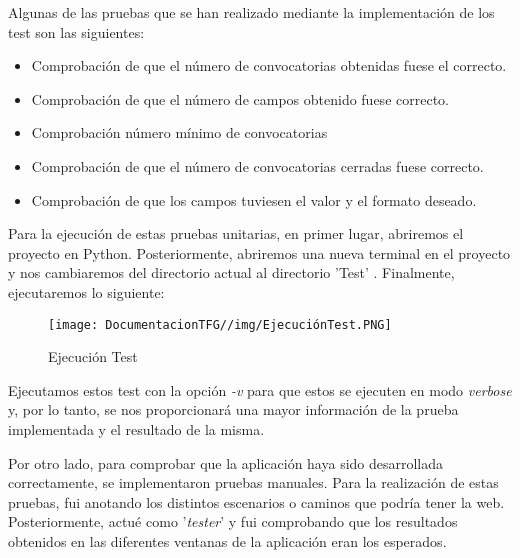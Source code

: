 Algunas de las pruebas que se han realizado mediante la implementación de los test son las siguientes:

\begin{itemize}
    \item Comprobación de que el número de convocatorias obtenidas fuese el correcto.
    \item Comprobación de que el número de campos obtenido fuese correcto.
    \item Comprobación número mínimo de convocatorias
    \item Comprobación de que el número de convocatorias cerradas fuese correcto.
    \item Comprobación de que los campos tuviesen el valor y el formato deseado.
\end{itemize}

Para la ejecución de estas pruebas unitarias, en primer lugar, abriremos el proyecto en Python. Posteriormente, abriremos una nueva terminal en el proyecto y nos cambiaremos del directorio actual al directorio 'Test' . Finalmente, ejecutaremos lo siguiente: 

\begin{figure}[H]
    \centering
    \texttt{[image: DocumentacionTFG//img/EjecuciónTest.PNG]}
    \caption{Ejecución Test}
\end{figure}

Ejecutamos estos test con la opción \textit{-v} para que estos se ejecuten en modo \textit{verbose} y, por lo tanto, se nos proporcionará una mayor información de la prueba implementada y el resultado de la misma.

Por otro lado, para comprobar que la aplicación haya sido desarrollada correctamente, se implementaron pruebas manuales. Para la realización de estas pruebas, fui anotando los distintos escenarios o caminos que podría tener la web. Posteriormente, actué como '\textit{tester}' y fui comprobando que los resultados obtenidos en las diferentes ventanas de la aplicación eran los esperados.
